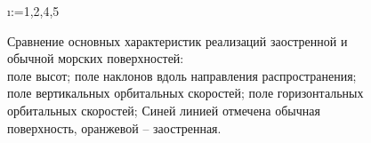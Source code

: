 \begin{figure}[H]
\centering
\makeatletter
    \@for\i:={1,2,4,5}

\label{fig:cwm_modeling}
\caption{
    Сравнение основных характеристик реализаций заостренной и обычной
    морских поверхностей: \\
     поле высот;
     поле наклонов вдоль направления
    распространения;
     поле вертикальных орбитальных скоростей;
     поле горизонтальных орбитальных скоростей;
    Синей линией отмечена обычная поверхность, оранжевой -- заостренная.
}
\makeatother
\end{figure}


